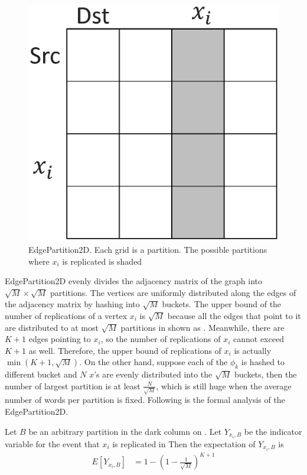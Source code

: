 \begin{figure}[h]
	\centering
	\includegraphics[scale=0.25]{figs/2dhash.eps}
	\caption{EdgePartition2D. Each grid is a partition.
	The possible partitions where $x_i$ is
	replicated is shaded}
	\label{fig:2dhash}
\end{figure}

EdgePartition2D evenly divides the adjacency matrix of the graph into $\sqrt{M}
\times \sqrt{M}$ partitions. The vertices are uniformly distributed along the
edges of the adjacency matrix by hashing into $\sqrt{M}$ buckets. The upper
bound of the number of replications of a vertex $x_i$ is $\sqrt{M}$ because all
the edges that point to it are distributed to at most $\sqrt{M}$ partitions
in shown as .  Meanwhile, there are $K+1$
edges pointing to $x_i$, so the number of replications of $x_i$ cannot exceed
$K+1$ as well. Therefore, the upper bound of replications of $x_i$ is actually
$\min(K+1, \sqrt{M})$. On the other hand, suppose each of the $\phi_k$ is
hashed to different bucket and $N$ $x$'s are evenly distributed into the
$\sqrt{M}$ buckets, then the number of largest partition is at least
$\frac{N}{\sqrt{M}}$, which is still huge when the average number of words per
partition is fixed. Following is the formal analysis of the EdgePartition2D.

Let $B$ be an arbitrary
partition in the dark column on .
Let $Y_{x_i, B}$ be the indicator variable for the event that $x_i$ is replicated in
Then the expectation of $Y_{x_i, B}$ is
\begin{align*}
	E[Y_{x_i, B}] &= 1 - (1 - \frac{1}{\sqrt{M}})^{K+1} \\
\end{align*}

